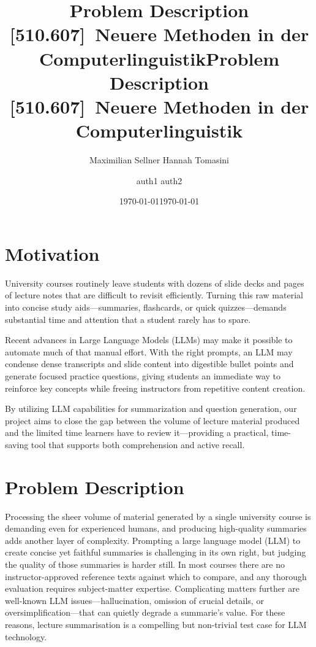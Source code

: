 \documentclass[
12pt,
paper=a4,
,captions=tableheading
]{scrartcl}
\title{Problem Description\\[1ex]\large[510.607]~Neuere Methoden in der Computerlinguistik}
\author{Maximilian Sellner Hannah Tomasini}
\date{\today}
\title{Problem Description\\[1ex]\large[510.607]~Neuere Methoden in der Computerlinguistik}
\author{auth1 auth2}
\date{\today}
\begin{document}
		\maketitle
	
	
	{
		\setcounter{tocdepth}{3}
		\tableofcontents
		\newpage
	}
	\section{Motivation}\label{motivation}
	University courses routinely leave students with dozens of slide decks and pages of lecture notes that are difficult to revisit efficiently. Turning this raw material into concise study aids—summaries, flashcards, or quick quizzes—demands substantial time and attention that a student rarely has to spare.
	
	Recent advances in Large Language Models (LLMs) may make it possible to automate much of that manual effort. With the right prompts, an LLM may condense dense transcripts and slide content into digestible bullet points and generate focused practice questions, giving students an immediate way to reinforce key concepts while freeing instructors from repetitive content creation.
	
	By utilizing LLM capabilities for summarization and question generation, our project aims to close the gap between the volume of lecture material produced and the limited time learners have to review it—providing a practical, time-saving tool that supports both comprehension and active recall.	
	
	\section{Problem Description}\label{problem-description}
	Processing the sheer volume of material generated by a single university course is demanding even for experienced humans, and producing high-quality summaries adds another layer of complexity. Prompting a large language model (LLM) to create concise yet faithful summaries is challenging in its own right, but judging the quality of those summaries is harder still. In most courses there are no instructor-approved reference texts against which to compare, and any thorough evaluation requires subject-matter expertise. Complicating matters further are well-known LLM issues—hallucination, omission of crucial details, or oversimplification—that can quietly degrade a summarie's value. For these reasons, lecture summarisation is a compelling but non-trivial test case for LLM technology.
\end{document}
